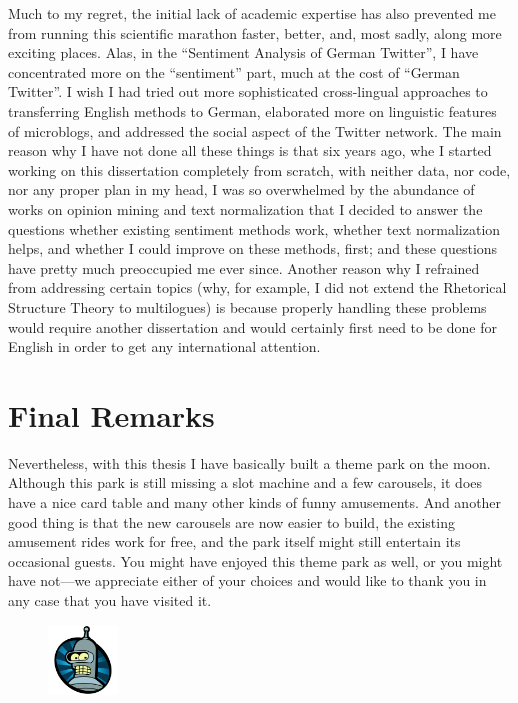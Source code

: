 Much to my regret, the initial lack of academic expertise has also
prevented me from running this scientific marathon faster, better,
and, most sadly, along more exciting places.  Alas, in the ``Sentiment
Analysis of German Twitter'', I have concentrated more on the
``sentiment'' part, much at the cost of ``German Twitter''.  I wish I
had tried out more sophisticated cross-lingual approaches to
transferring English methods to German, elaborated more on linguistic
features of microblogs, and addressed the social aspect of the Twitter
network.  The main reason why I have not done all these things is that
six years ago, whe I started working on this dissertation completely
from scratch, with neither data, nor code, nor any proper plan in my
head, I was so overwhelmed by the abundance of works on opinion mining
and text normalization that I decided to answer the questions whether
existing sentiment methods work, whether text normalization helps, and
whether I could improve on these methods, first; and these questions
have pretty much preoccupied me ever since.  Another reason why I
refrained from addressing certain topics (why, for example, I did not
extend the Rhetorical Structure Theory to multilogues) is because
properly handling these problems would require another dissertation
and would certainly first need to be done for English in order to get
any international attention.


\section*{Final Remarks}

Nevertheless, with this thesis I have basically built a theme park on
the moon.  Although this park is still missing a slot machine and a
few carousels, it does have a nice card table and many other kinds of
funny amusements.  And another good thing is that the new carousels
are now easier to build, the existing amusement rides work for free,
and the park itself might still entertain its occasional guests.  You
might have enjoyed this theme park as well, or you might have not---we
appreciate either of your choices and would like to thank you in any
case that you have visited it.
\begin{figure}[htb]
  \centering \includegraphics[height=5em]{img/bender.png}
\end{figure}
